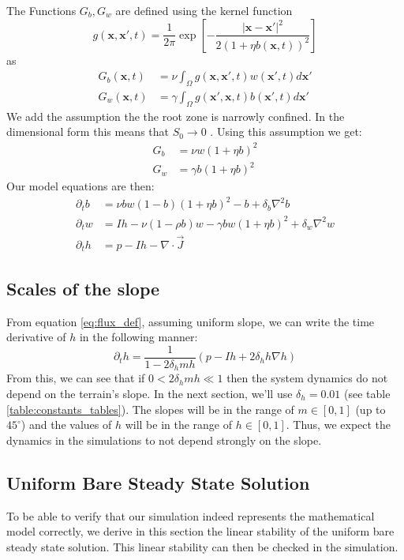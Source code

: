 \documentclass{article}
\numberwithin{equation}{section}
\begin{document}
The Functions $G_b,G_w$ are defined using the kernel function
\begin{equation}
    g(\mathbf{x}, \mathbf{x'},t) = \frac{1}{2\pi} \exp\left[-\frac{\left|\mathbf{x}-\mathbf{x'}\right|^2}{2(1+\eta b(\mathbf{x},t))^2}\right]
\end{equation} as \begin{align}
    G_b(\mathbf{x},t) & = \nu \int_\Omega g(\mathbf{x},\mathbf{x'},t)w(\mathbf{x'},t)d\mathbf{x'}    \\
    G_w(\mathbf{x},t) & = \gamma \int_\Omega g(\mathbf{x'},\mathbf{x},t)b(\mathbf{x'},t)d\mathbf{x'}
\end{align}
We add the assumption the the root zone is narrowly confined. In the dimensional form this means that $S_0\rightarrow 0$ \parencite[see][eq (3)]{gilad_phys_2004}. Using this assumption we get:
\begin{align}
    G_b & = \nu w (1+\eta b)^2   \\
    G_w & = \gamma b(1+\eta b)^2
\end{align}
Our model equations are then:
\begin{align}
    \partial_t b & = \nu bw(1-b)(1+\eta b)^2 - b + \delta_b\nabla^2 b                   \\
    \partial_t w & = I h - \nu(1-\rho b)w - \gamma bw(1+\eta b)^2 + \delta_w \nabla^2 w \\
    \partial_t h & = p - I h - \nabla \cdot \vec{J}
\end{align}

\subsection{Scales of the slope}
From equation \ref{eq:flux_def}, assuming uniform slope, we can write the time derivative of $h$ in the following manner:
\begin{equation}
    \partial_t h = \frac{1}{1 - 2\delta_h m h} \left(p - I h + 2\delta_h h\nabla h\right)
\end{equation}
From this, we can see that if $0 < 2\delta_h m h \ll 1$ then the system dynamics do not depend on the terrain's slope.
In the next section, we'll use $\delta_h=0.01$ (see table \ref{table:constants_tables}).
The slopes will be in the range of $m\in[0,1]$ (up to $45^\circ$) and the values of $h$ will be in the range of $h\in[0,1]$.
Thus, we expect the dynamics in the simulations to not depend strongly on the slope.

\subsection{Uniform Bare Steady State Solution}
To be able to verify that our simulation indeed represents the mathematical model correctly, we derive in this section the linear stability of the uniform bare steady state solution. This linear stability can then be checked in the simulation.
\end{document}
